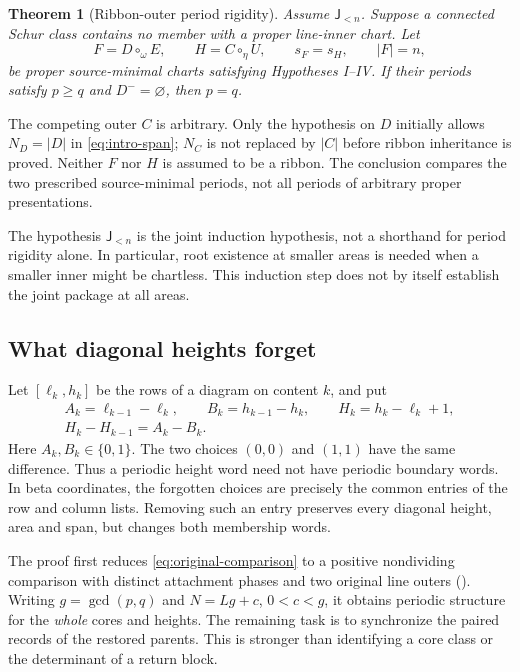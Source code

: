 \documentclass[11pt,a4paper]{amsart}
\numberwithin{equation}{section}
\theoremstyle{plain}
\newtheorem{theorem}{Theorem}[section]
\theoremstyle{definition}
\newcommand{\Jlower}{\mathsf J_{<n}}
\begin{document}
\begin{theorem}[Ribbon-outer period rigidity]\label{thm:main}
Assume \(\Jlower\).  Suppose a connected Schur class contains no member with a
proper line-inner chart.  Let
\begin{equation}\label{eq:original-comparison}
 F=D\circ_\omega E,\qquad H=C\circ_\eta U,\qquad
 s_F=s_H,\qquad |F|=n,
\end{equation}
be proper source-minimal charts satisfying Hypotheses I--IV.  If their periods
satisfy \(p\ge q\) and \(D^-=\varnothing\), then \(p=q\).
\end{theorem}

The competing outer \(C\) is arbitrary.  Only the hypothesis on \(D\) initially
allows \(N_D=|D|\) in \eqref{eq:intro-span}; \(N_C\) is not replaced by \(|C|\)
before ribbon inheritance is proved.  Neither \(F\) nor \(H\) is assumed to be a
ribbon.  The conclusion compares the two prescribed source-minimal periods,
not all periods of arbitrary proper presentations.

The hypothesis \(\Jlower\) is the joint induction hypothesis, not a shorthand
for period rigidity alone.  In particular, root existence at smaller areas is
needed when a smaller inner might be chartless.  This induction step does not by
itself establish the joint package at all areas.

\subsection{What diagonal heights forget}

Let \([\ell_k,h_k]\) be the rows of a diagram on content \(k\), and put
\begin{equation}\label{eq:intro-bits}
 \begin{gathered}
 A_k=\ell_{k-1}-\ell_k,\qquad B_k=h_{k-1}-h_k,
 \qquad H_k=h_k-\ell_k+1,\\
 H_k-H_{k-1}=A_k-B_k.
 \end{gathered}
\end{equation}
Here \(A_k,B_k\in\{0,1\}\).  The two choices \((0,0)\) and \((1,1)\) have the same
difference.  Thus a periodic height word need not have periodic boundary words.
In beta coordinates, the forgotten choices are precisely the common entries
of the row and column lists.  Removing such an entry preserves every diagonal
height, area and span, but changes both membership words.

The proof first reduces \eqref{eq:original-comparison} to a positive
nondividing comparison with distinct attachment phases and two original line
outers ().  Writing \(g=\gcd(p,q)\) and
\(N=Lg+c\), \(0<c<g\), it obtains periodic
structure for the \emph{whole} cores and heights.  The remaining task is to
synchronize the paired records of the restored parents.  This is stronger than
identifying a core class or the determinant of a return block.
\end{document}
